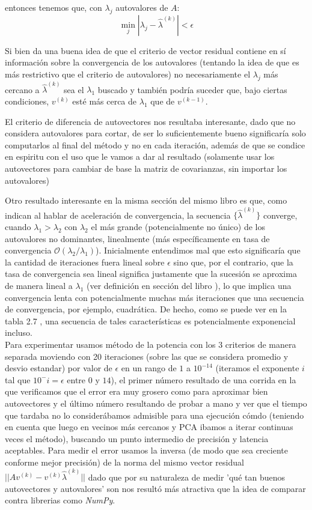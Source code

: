 entonces tenemos que, con $\lambda_j$ autovalores de $A$:
\begin{equation}
 \min_{j}|\lambda_j - \hat{\lambda}^{(k)}| < \epsilon
\end{equation}

Si bien da una buena idea de que el criterio de vector residual contiene en sí información sobre la convergencia de los autovalores (tentando la idea de que es más restrictivo que el criterio de autovalores) no necesariamente el $\lambda_j$ más cercano a $\hat{\lambda}^{(k)}$ sea el $\lambda_1$ buscado y también podría suceder que, bajo ciertas condiciones, $v^{(k)}$ esté más cerca de $\lambda_1$ que de $v^{(k-1)}$.

El criterio de diferencia de autovectores nos resultaba interesante, dado que no considera autovalores para cortar, de ser lo suficientemente bueno significaría solo computarlos al final del método y no en cada iteración, además de que se condice en espiritu con el uso que le vamos a dar al resultado (solamente usar los autovectores para cambiar de base la matriz de covarianzas, sin importar los autovalores)

Otro resultado interesante en la misma sección del mismo libro es que, como indican al hablar de aceleración de convergencia, la secuencia $\{\hat{\lambda}^{(k)}\}$ converge, cuando $\lambda_1 > \lambda_2 $ con $\lambda_2$ el más grande (potencialmente no único) de los autovalores no dominantes, linealmente (más específicamente en tasa de convergencia $\mathcal{O}(\lambda_2/\lambda_1)$).
Inicialmente entendimos mal que esto significaría que la cantidad de iteraciones fuera lineal sobre $\epsilon$ sino que, por el contrario, que la tasa de convergencia sea lineal significa justamente que la sucesión se aproxima de manera lineal a $\lambda_1$ (ver definición en sección del libro \cite{Burden}), lo que implica una convergencia lenta con potencialmente muchas más iteraciones que una secuencia de convergencia, por ejemplo, cuadrática. De hecho, como se puede ver en la tabla 2.7 \cite{Burden}, una secuencia de tales características es potencialmente exponencial incluso.\\

Para experimentar usamos método de la potencia con los 3 criterios de manera separada moviendo con 20 iteraciones (sobre las que se considera promedio y desvio estandar) por valor de $\epsilon$ en un rango de $1$ a $10^{-14}$ (iteramos el exponente $i$ tal que $10^-i=\epsilon$ entre $0$ y $14$), el primer número resultado de una corrida en la que verificamos que el error era muy grosero como para aproximar bien autovectores y el último número resultando de probar a mano y ver que el tiempo que tardaba no lo considerábamos admisible para una ejecución cómdo (teniendo en cuenta que luego en vecinos más cercanos y PCA ibamos a iterar continuas veces el método), buscando un punto intermedio de precisión y latencia aceptables. Para medir el error usamos la inversa (de modo que sea creciente conforme mejor precisión) de la norma del mismo vector residual $|| A v^{(k)} - v^{(k)}\hat{\lambda}^{(k)} ||$ dado que por su naturaleza de medir 'qué tan buenos autovectores y autovalores' son nos resultó más atractiva que la idea de comparar contra librerias como \textit{NumPy}.

